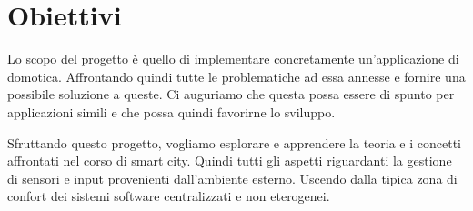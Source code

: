 \section{Obiettivi}

Lo scopo del progetto \`e quello di implementare concretamente un'applicazione di domotica. Affrontando quindi tutte le problematiche ad essa annesse e fornire una possibile soluzione a queste. Ci auguriamo che questa possa essere di spunto per applicazioni simili e che possa quindi favorirne lo sviluppo.

Sfruttando questo progetto, vogliamo esplorare e apprendere la teoria e i concetti affrontati nel corso di smart city. Quindi tutti gli aspetti riguardanti la gestione di sensori e input provenienti dall'ambiente esterno. Uscendo dalla tipica zona di confort dei sistemi software centralizzati e non eterogenei.


\newpage


